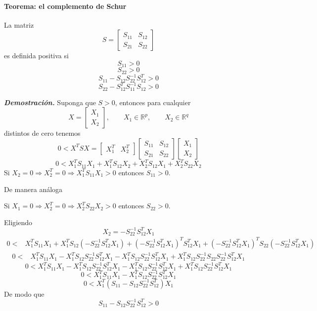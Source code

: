 \begin{flushright}
\end{flushright}

\paragraph{Teorema: el complemento de Schur}
La matriz
\[
  S=
  \begin{bmatrix}
    S_{11} & S_{12}\\
    S_{21} & S_{22}
  \end{bmatrix}
\]
es definida positiva si
\[
  S_{11}>0
\]
\[
  S_{22}>0
\]
\[
  S_{11}-S_{12}S_{22}^{-1}S_{12}^{T}>0
\]
\[
  S_{22}-S_{12}^{T}S_{11}^{-1}S_{12}>0
\]

\medskip
\noindent\textit{\textbf{Demostración.}}
Suponga que $S>0$, entonces para cualquier
\[
  X=
  \begin{bmatrix}
    X_1\\
    X_2
  \end{bmatrix},
  \qquad
  X_1\in\mathbb{R}^{p},
  \qquad
  X_2\in\mathbb{R}^{q}
\]
distintos de cero tenemos
\[
  0<X^{T}SX
  =
  \begin{bmatrix}
    X_1^{T} & X_2^{T}
  \end{bmatrix}
  \begin{bmatrix}
    S_{11} & S_{12}\\
    S_{21} & S_{22}
  \end{bmatrix}
  \begin{bmatrix}
    X_1\\
    X_2
  \end{bmatrix}
\]
\[
  0<X_1^{T}S_{11}X_1
  +X_1^{T}S_{12}X_2
  +X_2^{T}S_{12}X_1
  +X_2^{T}S_{22}X_2
\]
Si $X_2=0\Rightarrow X_2^{T}=0\Rightarrow
X_1^{T}S_{11}X_1>0$ entonces $S_{11}>0$.

De manera análoga

Si $X_1=0\Rightarrow X_2^{T}=0\Rightarrow
X_2^{T}S_{22}X_2>0$ entonces $S_{22}>0$.

Eligiendo
\[
  X_2=-S_{22}^{-1}S_{12}^{T}X_1
\]
\begin{align*}
  0<{}&X_1^{T}S_{11}X_1
  +X_1^{T}S_{12}(-S_{22}^{-1}S_{12}^{T}X_1)
  +(-S_{22}^{-1}S_{12}^{T}X_1)^{T}S_{12}^{T}X_1
  +(-S_{22}^{-1}S_{12}^{T}X_1)^{T}
  S_{22}(-S_{22}^{-1}S_{12}^{T}X_1)
\end{align*}
\begin{align*}
  0<{}&X_1^{T}S_{11}X_1
  -X_1^{T}S_{12}S_{22}^{-1}S_{12}^{T}X_1
  -X_1^{T}S_{12}S_{22}^{-1}S_{12}^{T}X_1
  +X_1^{T}S_{12}S_{22}^{-1}S_{22}
  S_{22}^{-1}S_{12}^{T}X_1
\end{align*}
\[
  0<X_1^{T}S_{11}X_1
  -X_1^{T}S_{12}S_{22}^{-1}S_{12}^{T}X_1
  -X_1^{T}S_{12}S_{22}^{-1}S_{12}^{T}X_1
  +X_1^{T}S_{12}S_{22}^{-1}S_{12}^{T}X_1
\]
\[
  0<X_1^{T}S_{11}X_1
  -X_1^{T}S_{12}S_{22}^{-1}S_{12}^{T}X_1
\]
\[
  0<X_1^{T}
  (S_{11}-S_{12}S_{22}^{-1}S_{12}^{T})X_1
\]
De modo que
\[
  S_{11}-S_{12}S_{22}^{-1}S_{12}^{T}>0
\]


